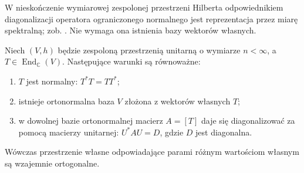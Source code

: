 W nieskończenie wymiarowej zespolonej przestrzeni Hilberta odpowiednikiem diagonalizacji operatora ograniczonego normalnego jest reprezentacja przez miarę spektralną; zob. . Nie wymaga ona istnienia bazy wektorów własnych.

\begin{twierdzenie}
\label{thm:lin14-normal-spectral}
Niech \((V,h)\) będzie zespoloną
przestrzenią unitarną o wymiarze
\(n<\infty\), a
\(T\in\operatorname{End}_{\mathbb C}(V)\).
Następujące warunki są równoważne:
\begin{enumerate}[label=(\roman*)]
\item \(T\) jest normalny:
      \(T^*T=TT^*\);
\item istnieje ortonormalna baza \(V\)
      złożona z wektorów własnych \(T\);
\item w dowolnej bazie ortonormalnej
      macierz \(A=[T]\) daje się
      diagonalizować za pomocą
      macierzy unitarnej:
      \(U^*AU=D\), gdzie \(D\)
      jest diagonalna.
\end{enumerate}
Wówczas przestrzenie własne
odpowiadające parami różnym wartościom
własnym są wzajemnie ortogonalne.
\end{twierdzenie}
